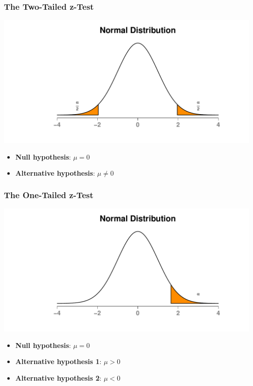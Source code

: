 \documentclass[12pt, block=fill]{beamer}
\begin{document}
\begin{frame}
  \frametitle{The Two-Tailed z-Test}

\begin{center} 
    \includegraphics[width=\linewidth]{figures/normal_with_two_tails}
  \end{center}
  \begin{itemize}
  \item \textbf{Null hypothesis}: $\mu = 0$
  \item \textbf{Alternative hypothesis}: $\mu \neq 0$
  \end{itemize} 
\end{frame}

\begin{frame}
  \frametitle{The One-Tailed z-Test}
  \begin{center}
    \includegraphics[width=\linewidth]{figures/normal_with_one_tail}
  \end{center}
  \begin{itemize}
  \item \textbf{Null hypothesis}: $\mu = 0$
  \item \textbf{Alternative hypothesis 1}: $\mu > 0$
  \item \textbf{Alternative hypothesis 2}: $\mu < 0$ 
  \end{itemize}
\end{frame}
\end{document}
